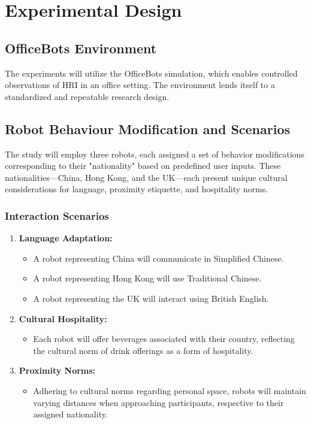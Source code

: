 \section{Experimental Design}

\subsection{OfficeBots Environment}

The experiments will utilize the OfficeBots simulation, which enables controlled observations of HRI in an office setting. The environment lends itself to a standardized and repeatable research design.

\subsection{Robot Behaviour Modification and Scenarios}

The study will employ three robots, each assigned a set of behavior modifications corresponding to their "nationality" based on predefined user inputs. These nationalities—China, Hong Kong, and the UK—each present unique cultural considerations for language, proximity etiquette, and hospitality norms.

\subsubsection{Interaction Scenarios}

\begin{enumerate}
    \item \textbf{Language Adaptation:}
    \begin{itemize}
        \item A robot representing China will communicate in Simplified Chinese.
        \item A robot representing Hong Kong will use Traditional Chinese.
        \item A robot representing the UK will interact using British English.
    \end{itemize}
    
    \item \textbf{Cultural Hospitality:}
    \begin{itemize}
        \item Each robot will offer beverages associated with their country, reflecting the cultural norm of drink offerings as a form of hospitality.
    \end{itemize}
    
    \item \textbf{Proximity Norms:}
    \begin{itemize}
        \item Adhering to cultural norms regarding personal space, robots will maintain varying distances when approaching participants, respective to their assigned nationality.
    \end{itemize}
\end{enumerate}

